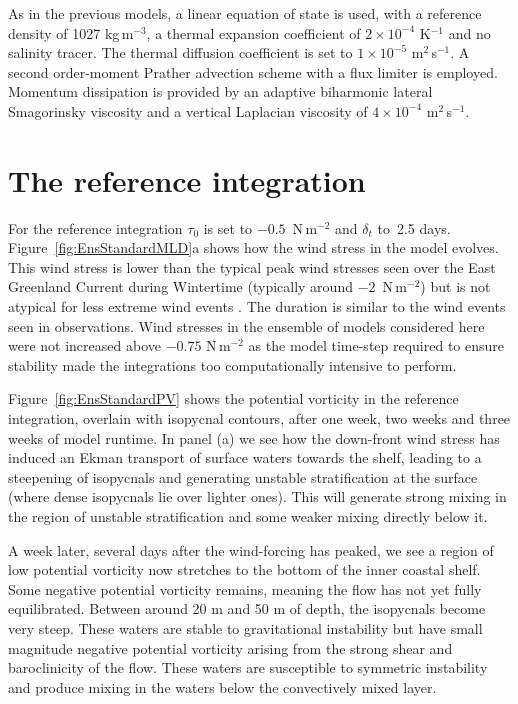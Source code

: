 As in the previous models, a linear equation of state is used, with a reference density of 1027 kg\,m$^{-3}$, a thermal expansion coefficient of $2 \times 10^{-4}$ K$^{-1}$ and no salinity tracer. The thermal diffusion coefficient is set to $1 \times 10^{-5}$ m$^2$\,s$^{-1}$. A second order-moment Prather advection scheme with a flux limiter is employed. Momentum dissipation is provided by an adaptive biharmonic lateral Smagorinsky viscosity and a vertical Laplacian viscosity of $4 \times 10^{-4}$ m$^2$\,s$^{-1}$.  

\section{The reference integration}
\label{sec:IrmRef}
For the reference integration $\tau_0$ is set to $-0.5$~N\,m$^{-2}$ and $\delta_t$ to~2.5 days. Figure~\ref{fig:EnsStandardMLD}a shows how the wind stress in the model evolves. This wind stress is lower than the typical peak wind stresses seen over the East Greenland Current during Wintertime (typically around $-2$~N\,m$^{-2}$) but is not atypical for less extreme wind events \citep{Moore2008, Harden2012, LeBras2022}. The duration is similar to the wind events seen in observations. Wind stresses in the ensemble of models considered here were not increased above $-0.75$ N\,m$^{-2}$ as the model time-step required to ensure stability made the integrations too computationally intensive to perform.

Figure~\ref{fig:EnsStandardPV} shows the potential vorticity in the reference integration, overlain with isopycnal contours, after one week, two weeks and three weeks of model runtime. In panel (a) we see how the down-front wind stress has induced an Ekman transport of surface waters towards the shelf, leading to a steepening of isopycnals and generating unstable stratification at the surface (where dense isopycnals lie over lighter ones). This will generate strong mixing in the region of unstable stratification and some weaker mixing directly below it.

A week later, several days after the wind-forcing has peaked, we see a region of low potential vorticity now stretches to the bottom of the inner coastal shelf. Some negative potential vorticity remains, meaning the flow has not yet fully equilibrated. Between around 20 m and 50 m of depth, the isopycnals become very steep. These waters are stable to gravitational instability but have small magnitude negative potential vorticity arising from the strong shear and baroclinicity of the flow. These waters are susceptible to symmetric instability and produce mixing in the waters below the convectively mixed layer.

